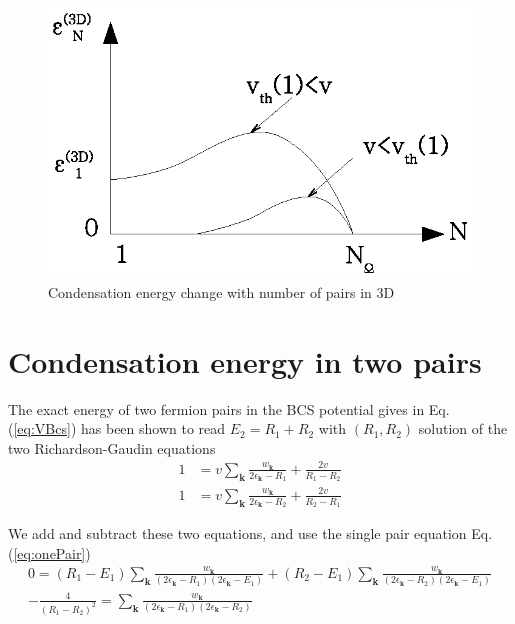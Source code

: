 \documentclass{article}
\newcommand{\vk}{\ensuremath{\mathbf{k}}}
\begin{document}
\begin{figure}[htb]
	\centering
		\includegraphics{3dCondChange.eps}
	\caption{Condensation energy change with number of pairs in 3D}
	\label{fig:3dCondChange}
\end{figure}

\section{Condensation energy in two pairs\label{sec:twoPair}}
The exact energy of two fermion pairs in the BCS potential gives in Eq. (\ref{eq:VBcs}) has been shown to read $E_2=R_1+R_2$ with $(R_1,R_2)$ solution of the two Richardson-Gaudin equations
\begin{equation}
\begin{split}
1&=v\sum_{\vk}\frac{w_\vk}{2\epsilon_\vk-R_1}+\frac{2v}{R_1-R_2}\\
1&=v\sum_{\vk}\frac{w_\vk}{2\epsilon_\vk-R_2}+\frac{2v}{R_2-R_1}
\end{split}
\label{eq:richardsonEq}
\end{equation}

We add and subtract these two equations, and use the single pair equation Eq. (\ref{eq:onePair})
\begin{gather}
0=(R_1-E_1)\sum_{\vk}\frac{w_\vk}{(2\epsilon_\vk-R_1)(2\epsilon_\vk-E_1)}+(R_2-E_1)\sum_{\vk}\frac{w_\vk}{(2\epsilon_\vk-R_2)(2\epsilon_\vk-E_1)}\label{eq:2PairPlus}\\
-\frac{4}{(R_1-R_2)^2}=\sum_{\vk}\frac{w_\vk}{(2\epsilon_\vk-R_1)(2\epsilon_\vk-R_2)}\label{eq:2PairMinus}
\end{gather}
\end{document}
